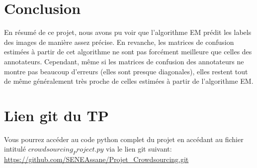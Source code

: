 \documentclass[a4paper,french,10pt]{article}
\begin{document}
	\section{Conclusion}
	En résumé de ce projet, nous avons pu voir que l'algorithme EM prédit les labels des images de manière assez précise. En revanche, les matrices de confusion estimées à partir de cet algorithme ne sont pas forcément meilleure que celles des annotateurs. 
	Cependant, même si les matrices de confusion des annotateurs ne montre pas beaucoup d'erreurs (elles sont presque diagonales), elles restent tout de même généralement très proche de celles estimées à partir de l'algorithme EM.
	
	\section{Lien git du TP}
	Vous pourrez accéder au code python complet du projet en accédant au fichier intitulé $crowdsourcing_Project.py$ via le lien git suivant:\\
	\url{https://github.com/SENEAssane/Projet_Crowdsourcing.git}
	
\end{document}
